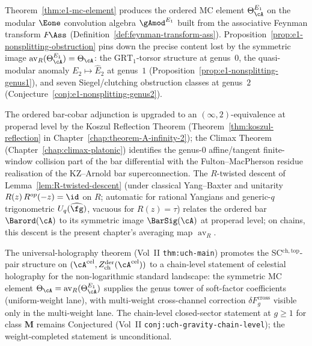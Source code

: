 \begin{remark}
\label{rem:e1-bridge-three-step}
Theorem~\ref{thm:e1-mc-element} produces the ordered MC
element $\Theta_\cA^{E_1}$ on the modular $\Eone$ convolution
algebra ${\gAmod}^{E_1}$ built from the associative Feynman
transform $F\!\Ass$
(Definition~\ref{def:feynman-transform-ass}).
Proposition~\ref{prop:e1-nonsplitting-obstruction} pins down
the precise content lost by the symmetric image
$\operatorname{av}_R(\Theta_\cA^{E_1}) = \Theta_\cA$:
the $\mathrm{GRT}_1$-torsor structure at genus~$0$, the
quasi-modular anomaly $E_2 \mapsto \widehat{E}_2$ at
genus~$1$ (Proposition~\ref{prop:e1-nonsplitting-genus1}),
and seven Siegel/clutching obstruction classes at genus~$2$
(Conjecture~\ref{conj:e1-nonsplitting-genus2}).

The ordered bar-cobar adjunction is upgraded to an
$(\infty,2)$-equivalence at properad level by the
Koszul Reflection Theorem
(Theorem~\ref{thm:koszul-reflection} in
Chapter~\ref{chap:theorem-A-infinity-2}); the Climax
Theorem (Chapter~\ref{chap:climax-platonic}) identifies the
genus-$0$ affine/tangent finite-window collision part of the bar
differential with the Fulton--MacPherson residue realisation of the
KZ--Arnold bar superconnection.
The $R$-twisted descent of
Lemma~\ref{lem:R-twisted-descent} (under classical Yang--Baxter
and unitarity $R(z)\,R^{op}(-z)=\id$ on $R$; automatic for
rational Yangians and generic-$q$ trigonometric
$U_q(\widehat{\fg})$, vacuous for $R(z)=\tau$) relates the ordered
bar $\Barord(\cA)$ to its symmetric image $\BarSig(\cA)$ at
properad level; on chains, this descent is the present
chapter's averaging map $\operatorname{av}_R$.

The universal-holography theorem
\textup{(}Vol~II \texttt{thm:uch-main}\textup{)} promotes the
SC$^{\mathrm{ch,top}}$-pair structure on
$(\cA^{\mathrm{cel}},
Z^{\mathrm{der}}_{\mathrm{ch}}(\cA^{\mathrm{cel}}))$
to a chain-level statement of celestial holography for the
non-logarithmic standard landscape: the symmetric MC element
$\Theta_\cA = \operatorname{av}_R(\Theta_\cA^{E_1})$ supplies
the genus tower of soft-factor coefficients (uniform-weight
lane), with multi-weight cross-channel correction
$\delta F_g^{\mathrm{cross}}$ visible only in the multi-weight
lane. The chain-level closed-sector statement at
$g\ge 1$ for class $\mathbf{M}$ remains
\textup{Conjectured} \textup{(}Vol~II
\texttt{conj:uch-gravity-chain-level}\textup{)}; the
weight-completed statement is unconditional.
\end{remark}

